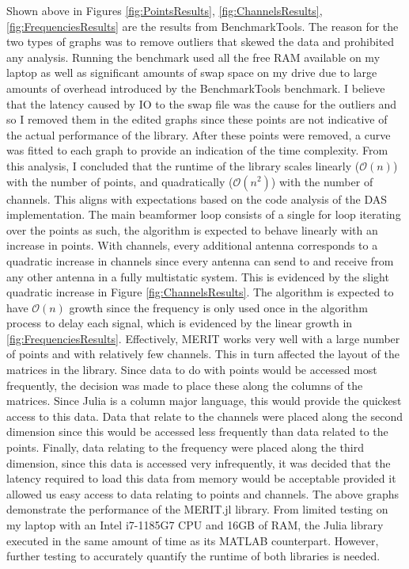 Shown above in Figures \ref{fig:PointsResults}, \ref{fig:ChannelsResults}, \ref{fig:FrequenciesResults} are the results
from BenchmarkTools. The reason for the two types of graphs was to remove outliers that skewed the data and prohibited
any analysis. Running the benchmark used all the free RAM available on my laptop as well as significant amounts of swap
space on my drive due to large amounts of overhead introduced by the BenchmarkTools benchmark. I believe that the
latency caused by IO to the swap file was the cause for the outliers and so I removed them in the edited graphs since
these points are not indicative of the actual performance of the library. After these points were removed, a curve was
fitted to each graph to provide an indication of the time complexity. From this analysis, I concluded that the runtime
of the library scales linearly ($\mathcal{O}(n)$) with the number of points, and quadratically ($\mathcal{O}(n^2)$) with
the number of channels. This aligns with expectations based on the code analysis of the DAS implementation. The main
beamformer loop consists of a single for loop iterating over the points as such, the algorithm is expected to behave
linearly with an increase in points. With channels, every additional antenna corresponds to a quadratic increase in
channels since every antenna can send to and receive from any other antenna in a fully multistatic system. This is
evidenced by the slight quadratic increase in Figure \ref{fig:ChannelsResults}. The algorithm is expected to have
$\mathcal{O}(n)$ growth since the frequency is only used once in the algorithm process to delay each signal, which is
evidenced by the linear growth in \ref{fig:FrequenciesResults}. Effectively, MERIT works very well with a large number
of points and with relatively few channels. This in turn affected the layout of the matrices in the library. Since data
to do with points would be accessed most frequently, the decision was made to place these along the columns of the
matrices. Since Julia is a column major language, this would provide the quickest access to this data. Data that relate
to the channels were placed along the second dimension since this would be accessed less frequently than data related to
the points. Finally, data relating to the frequency were placed along the third dimension, since this data is accessed
very infrequently, it was decided that the latency required to load this data from memory would be acceptable provided
it allowed us easy access to data relating to points and channels. The above graphs demonstrate the performance of the
MERIT.jl library. From limited testing on my laptop with an Intel i7-1185G7 CPU and 16GB of RAM, the Julia library
executed in the same amount of time as its MATLAB counterpart. However, further testing to accurately quantify the
runtime of both libraries is needed.